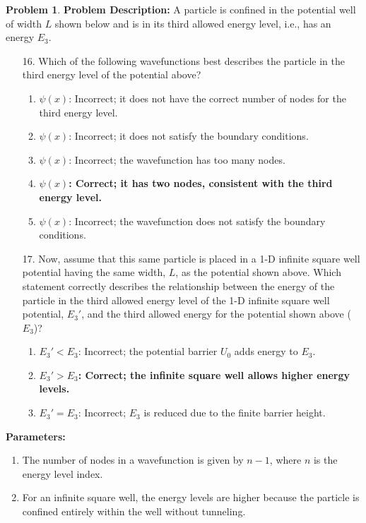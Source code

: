 \documentclass[12pt]{article}
\theoremstyle{definition} %
\newtheorem{problem}{Problem}
\theoremstyle{plain} %
\begin{document}
\begin{problem}
    
\textbf{Problem Description:}
A particle is confined in the potential well of width \(L\) shown below and is in its third allowed energy level, i.e., has an energy \(E_3\).

\begin{enumerate}
    \item[16.] Which of the following wavefunctions best describes the particle in the third energy level of the potential above?
    \begin{enumerate}
        \item \(\psi(x)\): Incorrect; it does not have the correct number of nodes for the third energy level.
        \item \(\psi(x)\): Incorrect; it does not satisfy the boundary conditions.
        \item \(\psi(x)\): Incorrect; the wavefunction has too many nodes.
        \item \textbf{\(\psi(x)\): Correct; it has two nodes, consistent with the third energy level.}
        \item \(\psi(x)\): Incorrect; the wavefunction does not satisfy the boundary conditions.
    \end{enumerate}

    \item[17.] Now, assume that this same particle is placed in a 1-D infinite square well potential having the same width, \(L\), as the potential shown above. Which statement correctly describes the relationship between the energy of the particle in the third allowed energy level of the 1-D infinite square well potential, \(E_3'\), and the third allowed energy for the potential shown above (\(E_3\))?
    \begin{enumerate}
        \item \(E_3' < E_3\): Incorrect; the potential barrier \(U_0\) adds energy to \(E_3\).
        \item \textbf{\(E_3' > E_3\): Correct; the infinite square well allows higher energy levels.}
        \item \(E_3' = E_3\): Incorrect; \(E_3\) is reduced due to the finite barrier height.
    \end{enumerate}
\end{enumerate}

\textbf{Parameters:}
\begin{enumerate}
    \item The number of nodes in a wavefunction is given by \(n - 1\), where \(n\) is the energy level index.
    \item For an infinite square well, the energy levels are higher because the particle is confined entirely within the well without tunneling.
\end{enumerate}


\end{problem}
\end{document}
